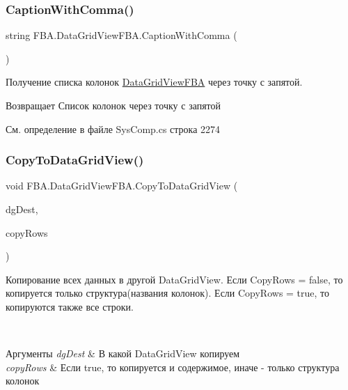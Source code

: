 \subsubsection{\texorpdfstring{Caption\+With\+Comma()}{CaptionWithComma()}}
{\footnotesize\ttfamily string F\+B\+A.\+Data\+Grid\+View\+F\+B\+A.\+Caption\+With\+Comma (\begin{DoxyParamCaption}{ }\end{DoxyParamCaption})}



Получение списка колонок \mbox{\hyperlink{class_f_b_a_1_1_data_grid_view_f_b_a}{Data\+Grid\+View\+F\+BA}} через точку с запятой. 

\begin{DoxyReturn}{Возвращает}
Список колонок через точку с запятой
\end{DoxyReturn}


См. определение в файле Sys\+Comp.\+cs строка 2274

\mbox{\label{class_f_b_a_1_1_data_grid_view_f_b_a_af609918de53571c53bfff7913904093d}} 
\subsubsection{\texorpdfstring{Copy\+To\+Data\+Grid\+View()}{CopyToDataGridView()}}
{\footnotesize\ttfamily void F\+B\+A.\+Data\+Grid\+View\+F\+B\+A.\+Copy\+To\+Data\+Grid\+View (\begin{DoxyParamCaption}\item[{\mbox{\hyperlink{class_f_b_a_1_1_data_grid_view_f_b_a}{F\+B\+A.\+Data\+Grid\+View\+F\+BA}}}]{dg\+Dest,  }\item[{bool}]{copy\+Rows }\end{DoxyParamCaption})}





Копирование всех данных в другой Data\+Grid\+View. Если Copy\+Rows = false, то копируется только структура(названия колонок). Если Copy\+Rows = true, то копируются также все строки. 

~\newline

\begin{DoxyParams}{Аргументы}
{\em dg\+Dest} & В какой Data\+Grid\+View копируем\\
\hline
{\em copy\+Rows} & Если true, то копируется и содержимое, иначе -\/ только структура колонок\\
\hline
\end{DoxyParams}


